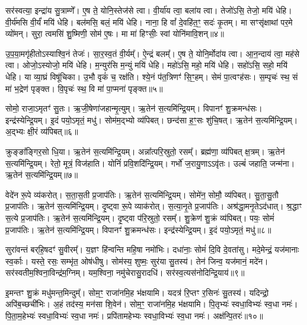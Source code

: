 सर॑स्वत्या॒ इन्द्रा॑य सु॒त्राम्णे᳚।
ए॒ष ते॒ योनि॒स्तेज॑से त्वा।
वी॒र्या॑य त्वा॒ बला॑य त्वा।
तेजो॑ऽसि॒ तेजो॒ मयि॑ धेहि।
वी॒र्य॑मसि वी॒र्यं॑ मयि॑ धेहि।
बल॑मसि॒ बलं॒ मयि॑ धेहि।
नाना॒ हि वां᳚ दे॒वहि॑त॒ꣳ॒ सदः॑ कृ॒तम्।
मा सꣳसृ॑क्षाथां पर॒मे व्यो॑मन्।
सुरा॒ त्वमसि॑ शु॒ष्मिणी॒ सोम॑ ए॒षः।
मा मा॑ हिꣳसीः॒ स्वां योनि॑मावि॒शन्॥४॥\ip

उ॒प॒या॒मगृ॑हीतो\-ऽस्याश्वि॒नं तेजः॑।
सा॒र॒स्व॒तं वी॒र्यम्᳚।
ऐ॒न्द्रं बलम्᳚।
ए॒ष ते॒ योनि॒र्मोदा॑य त्वा।
आ॒न॒न्दाय॑ त्वा॒ मह॑से त्वा।
ओजो॒ऽस्योजो॒ मयि॑ धेहि।
म॒न्युर॑सि म॒न्युं मयि॑ धेहि।
महो॑ऽसि॒ महो॒ मयि॑ धेहि।
सहो॑ऽसि॒ सहो॒ मयि॑ धेहि।
या व्या॒घ्रं विषू॑चिका।
उ॒भौ वृकं॑ च॒ रक्ष॑ति।
श्ये॒नं प॑त॒त्रिणꣳ॑ सि॒ꣳ॒हम्।
सेमं पा॒त्वꣳह॑सः।
स॒म्पृचः॑ स्थ॒ सं मा॑ भ॒द्रेण॑ पृङ्क्त।
वि॒पृचः॑ स्थ॒ वि मा॑ पा॒प्मना॑ पृङ्क्त॥५॥\ip\anuvakamend[ह॒विः प्र॒त्यङ्ख्सोमो॒ अति॑द्रुतो गृह्णाम्यावि॒शन्विषू॑चिका॒ पञ्च॑ च]

सोमो॒ राजा॒\-ऽमृतꣳ॑ सु॒तः।
ऋ॒जी॒षेणा॑जहान्मृ॒त्युम्।
ऋ॒तेन॑ स॒त्यमि॑न्द्रि॒यम्।
विपानꣳ॑ शु॒क्रमन्ध॑सः।
इन्द्र॑स्येन्द्रि॒यम्।
इ॒दं पयो॒\-ऽमृतं॒ मधु॑।
सोम॑म॒द्भ्यो व्य॑पिबत्।
छन्द॑सा ह॒ꣳ॒सः शु॑चि॒षत्।
ऋ॒तेन॑ स॒त्यमि॑न्द्रि॒यम्।
अ॒द्भ्यः क्षी॒रं व्य॑पिबत्॥६॥\ip

क्रुङ्ङा᳚ङ्गिर॒सो धि॒या।
ऋ॒तेन॑ स॒त्यमि॑न्द्रि॒यम्।
अन्ना᳚त्परि॒स्रुतो॒ रसम्᳚।
ब्रह्म॑णा॒ व्य॑पिबत् क्ष॒त्रम्।
ऋ॒तेन॑ स॒त्यमि॑न्द्रि॒यम्।
रेतो॒ मूत्रं॒ विज॑हाति।
योनिं॑ प्रवि॒शदि॑न्द्रि॒यम्।
गर्भो॑ ज॒रायु॒णा\-ऽऽवृ॑तः।
उल्बं॑ जहाति॒ जन्म॑ना।
ऋ॒तेन॑ स॒त्यमि॑न्द्रि॒यम्॥७॥\ip

वेदे॑न रू॒पे व्य॑करोत्।
स॒ता॒स॒ती प्र॒जा\-प॑तिः।
ऋ॒तेन॑ स॒त्यमि॑न्द्रि॒यम्।
सोमे॑न॒ सोमौ॒ व्य॑पिबत्।
सु॒ता॒सु॒तौ प्र॒जा\-प॑तिः।
ऋ॒तेन॑ स॒त्यमि॑न्द्रि॒यम्।
दृ॒ष्ट्वा रू॒पे व्याक॑रोत्।
स॒त्या॒नृ॒ते प्र॒जा\-प॑तिः।
अश्र॑द्धा॒मनृ॒ते\-ऽद॑धात्।
श्र॒द्धाꣳ स॒त्ये प्र॒जा\-प॑तिः।
ऋ॒तेन॑ स॒त्यमि॑न्द्रि॒यम्।
दृ॒ष्ट्वा प॑रि॒स्रुतो॒ रसम्᳚।
शु॒क्रेण॑ शु॒क्रं व्य॑पिबत्।
पयः॒ सोमं॑ प्र॒जा\-प॑तिः।
ऋ॒तेन॑ स॒त्यमि॑न्द्रि॒यम्।
विपानꣳ॑ शु॒क्रमन्ध॑सः।
इन्द्र॑स्येन्द्रि॒यम्।
इ॒दं पयो॒\-ऽमृतं॒ मधु॑॥८॥\ip\anuvakamend[अ॒द्भ्यः क्षी॒रं व्य॑पिब॒ज्जन्म॑न॒र्तेन॑ स॒त्यमि॑न्द्रि॒यꣴ श्र॒द्धाꣳ स॒त्ये प्र॒जा\-प॑तिर॒ष्टौ च॑]

सुरा॑वन्तं बर्‌\mbox{}हि॒षदꣳ॑ सु॒वीरम्᳚।
य॒ज्ञꣳ हि॑न्वन्ति महि॒षा नमो॑भिः।
दधा॑नाः॒ सोमं॑ दि॒वि दे॒वता॑सु।
मदे॒मेन्द्रं॒ यज॑मानाः स्व॒र्काः।
यस्ते॒ रसः॒ सम्भृ॑त॒ ओष॑धीषु।
सोम॑स्य॒ शुष्मः॒ सुर॑या सु॒तस्य॑।
तेन॑ जिन्व॒ यज॑मानं॒ मदे॑न।
सर॑स्वतीम॒श्विना॒विन्द्र॑म॒ग्निम्।
यम॒श्विना॒ नमु॑चेरासु॒रादधि॑।
सर॑स्व॒त्यस॑नोदिन्द्रि॒याय॑॥९॥\ip

इ॒मन्तꣳ शु॒क्रं मधु॑मन्त॒मिन्दुम्᳚।
सोम॒ꣳ॒ राजा॑नमि॒ह भ॑क्षयामि।
यदत्र॑ रि॒प्तꣳ र॒सिनः॑ सु॒तस्य॑।
यदिन्द्रो॒ अपि॑ब॒च्छची॑भिः।
अ॒हं तद॑स्य॒ मन॑सा शि॒वेन॑।
सोम॒ꣳ॒ राजा॑नमि॒ह भ॑क्षयामि।
पि॒तृभ्यः॑ स्वधा॒विभ्यः॑ स्व॒धा नमः॑।
पि॒ता॒म॒हेभ्यः॑ स्वधा॒विभ्यः॑ स्व॒धा नमः॑।
प्रपि॑तामहेभ्यः स्वधा॒विभ्यः॑ स्व॒धा नमः॑।
अक्ष॑न्पि॒तरः॑॥१०॥\ip

